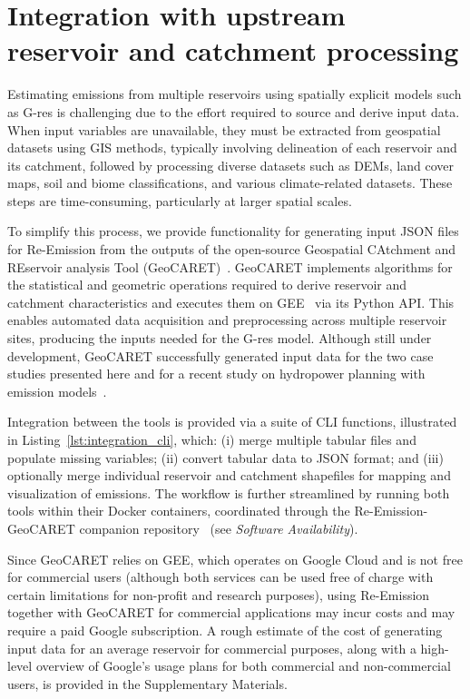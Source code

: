 \documentclass[review, authoryear, 1p]{elsarticle} %
\begin{document}
\section{Integration with upstream reservoir and catchment processing}
\label{sec:integration}

Estimating emissions from multiple reservoirs using spatially explicit models such as G-res is challenging due to the effort required to source and derive input data.
When input variables are unavailable, they must be extracted from geospatial datasets using \ac{GIS} methods, typically involving delineation of each reservoir and its catchment, followed by processing diverse datasets such as \acp{DEM}, land cover maps, soil and biome classifications, and various climate-related datasets.
These steps are time-consuming, particularly at larger spatial scales.

To simplify this process, we provide functionality for generating input JSON files for Re-Emission from the outputs of the open-source Geospatial CAtchment and REservoir analysis Tool (GeoCARET)~\citep{heettool}.
GeoCARET implements algorithms for the statistical and geometric operations required to derive reservoir and catchment characteristics and executes them on \ac{GEE}~\citep{Gorelick2017} via its Python API.
This enables automated data acquisition and preprocessing across multiple reservoir sites, producing the inputs needed for the G-res model.
Although still under development, GeoCARET successfully generated input data for the two case studies presented here and for a recent study on hydropower planning with emission models~\citep{janus2025planning}.

Integration between the tools is provided via a suite of \ac{CLI} functions, illustrated in Listing~\ref{lst:integration_cli}, which:
(i) merge multiple tabular files and populate missing variables; (ii) convert tabular data to JSON format; and (iii) optionally merge individual reservoir and catchment shapefiles for mapping and visualization of emissions.
The workflow is further streamlined by running both tools within their Docker containers, coordinated through the Re-Emission-GeoCARET companion repository~\citep{janus_geocaret_reemission} (see \emph{Software Availability}).

Since GeoCARET relies on \ac{GEE}, which operates on Google Cloud and is not free for commercial users (although both services can be used free of charge with certain limitations for non-profit and research purposes), using Re-Emission together with GeoCARET for commercial applications may incur costs and may require a paid Google subscription.
A rough estimate of the cost of generating input data for an average reservoir for commercial purposes, along with a high-level overview of Google's usage plans for both commercial and non-commercial users, is provided in the Supplementary Materials.
\end{document}
